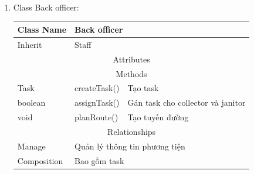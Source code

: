 \begin{enumerate}
        \item Class Back officer:
        \begin{table}[htp]
            \begin{tabular}{|lll|}
                \hline
                \multicolumn{1}{|l|}{Class Name}  & \multicolumn{2}{l|}{Back officer}                                     \\ \hline
                \multicolumn{1}{|l|}{Inherit}     & \multicolumn{2}{l|}{Staff}                                            \\ \hline
                \multicolumn{3}{|c|}{\cellcolor[HTML]{FFFFC7}Attributes}                                                  \\ \hline
                \multicolumn{3}{|c|}{\cellcolor[HTML]{FFFFC7}Methods}                                                     \\ \hline
                \multicolumn{1}{|l|}{Task}        & \multicolumn{1}{l|}{createTask()} & Tạo task                          \\ \hline
                \multicolumn{1}{|l|}{boolean}     & \multicolumn{1}{l|}{assignTask()} & Gán task cho collector và janitor \\ \hline
                \multicolumn{1}{|l|}{void}        & \multicolumn{1}{l|}{planRoute()}  & Tạo tuyến đường                   \\ \hline
                \multicolumn{3}{|c|}{\cellcolor[HTML]{FFFFC7}Relationships}                                               \\ \hline
                \multicolumn{1}{|l|}{Manage}      & \multicolumn{2}{l|}{Quản lý thông tin phương tiện}                    \\ \hline
                \multicolumn{1}{|l|}{Composition} & \multicolumn{2}{l|}{Bao gồm task}                                     \\ \hline
            \end{tabular}
        \end{table}
    
        \newpage
            

\end{enumerate}
